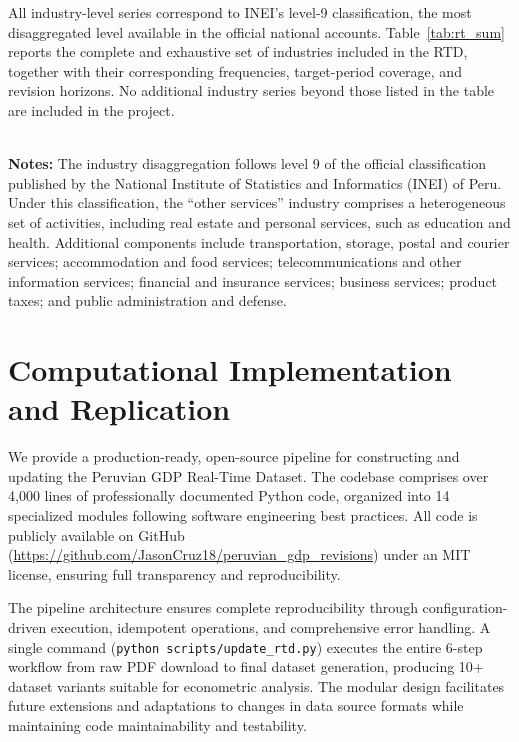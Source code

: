 \documentclass[a4paper, fleqn, 11pt]{article}
\newcommand{\bashcmd}[1]{\texttt{#1}}
\begin{document}
All industry-level series correspond to INEI’s level-9 classification, the most disaggregated level available in the official national accounts. Table~\ref{tab:rt_sum} reports the complete and exhaustive set of industries included in the RTD, together with their corresponding frequencies, target-period coverage, and revision horizons. No additional industry series beyond those listed in the table are included in the project.

\begin{table}[b!]
\caption{Sectoral GDP as a real-time indicator}
\label{tab:rt_sum}
\resizebox{\columnwidth}{!}{

%
}\\[2mm]
\footnotesize \textbf{Notes:} The industry disaggregation follows level 9 of the official classification published by the National Institute of Statistics and Informatics (INEI) of Peru. Under this classification, the ``other services'' industry comprises a heterogeneous set of activities, including real estate and personal services, such as education and health. Additional components include transportation, storage, postal and courier services; accommodation and food services; telecommunications and other information services; financial and insurance services; business services; product taxes; and public administration and defense.
\end{table}

\clearpage


\section{Computational Implementation and Replication}
\label{section:replication}

We provide a production-ready, open-source pipeline for constructing and updating the Peruvian GDP Real-Time Dataset. The codebase comprises over 4,000 lines of professionally documented Python code, organized into 14 specialized modules following software engineering best practices. All code is publicly available on GitHub (\url{https://github.com/JasonCruz18/peruvian_gdp_revisions}) under an MIT license, ensuring full transparency and reproducibility.

The pipeline architecture ensures complete reproducibility through configuration-driven execution, idempotent operations, and comprehensive error handling. A single command (\bashcmd{python scripts/update\_rtd.py}) executes the entire 6-step workflow from raw PDF download to final dataset generation, producing 10+ dataset variants suitable for econometric analysis. The modular design facilitates future extensions and adaptations to changes in data source formats while maintaining code maintainability and testability.
\end{document}
